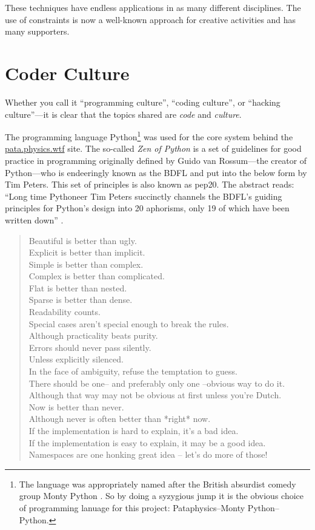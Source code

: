 These techniques have endless applications in as many different disciplines. The use of constraints is now a well-known approach for creative activities and has many supporters.


\section{Coder Culture}
\label{s:culture}

Whether you call it ``programming culture'', ``coding culture'', or ``hacking culture''---it is clear that the topics shared are \emph{code} and \emph{culture}.

The programming language Python\footnote{The language was appropriately named after the British absurdist comedy group Monty Python \autocite{Python2016}. So by doing a syzygious jump it is the obvious choice of programming lanuage for this project: Pataphysics--Monty Python--Python.} was used for the core system behind the \url{pata.physics.wtf} site. The so-called \textit{Zen of Python} is a set of guidelines for good practice in programming originally defined by Guido van Rossum---the creator of Python---who is endeeringly known as the \ac{BDFL} and put into the below form by Tim Peters. This set of principles is also known as \acs{pep}20. The abstract reads: ``Long time Pythoneer Tim Peters succinctly channels the \ac{BDFL}'s guiding principles for Python's design into 20 aphorisms, only 19 of which have been written down'' \autocite*{PEP20}.

\begin{quotation}
  Beautiful is better than ugly.\\
  Explicit is better than implicit.\\
  Simple is better than complex.\\
  Complex is better than complicated.\\
  Flat is better than nested.\\
  Sparse is better than dense.\\
  Readability counts.\\
  Special cases aren't special enough to break the rules.\\
  Although practicality beats purity.\\
  Errors should never pass silently.\\
  Unless explicitly silenced.\\
  In the face of ambiguity, refuse the temptation to guess.\\
  There should be one-- and preferably only one --obvious way to do it.\\
  Although that way may not be obvious at first unless you're Dutch.\\
  Now is better than never.\\
  Although never is often better than *right* now.\\
  If the implementation is hard to explain, it's a bad idea.\\
  If the implementation is easy to explain, it may be a good idea.\\
  Namespaces are one honking great idea -- let's do more of those!
\end{quotation}

